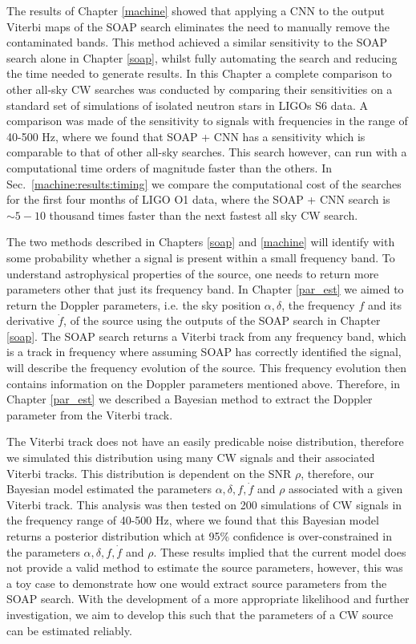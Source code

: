 The results of Chapter \ref{machine} showed that applying a \gls{CNN} to the output
Viterbi maps of the SOAP search eliminates the need to manually remove the
contaminated bands.  This method achieved a similar sensitivity to the SOAP
search alone in Chapter \ref{soap}, whilst fully automating the search and
reducing the time needed to generate results.  In this Chapter a complete
comparison to other all-sky \gls{CW}
searches was conducted by comparing their sensitivities on a standard set of
simulations of isolated neutron stars in \glspl{LIGO} S6 data.  A comparison
was made of the sensitivity to signals with frequencies in the range of 40-500
Hz, where we found that SOAP + \gls{CNN} has a sensitivity which is comparable to that of other all-sky searches.
This search however, can run with a computational time orders of magnitude
faster than the others. In Sec.~\ref{machine:results:timing} we
compare the computational cost of the searches for the first four months of
\gls{LIGO} O1 data, where the SOAP + \gls{CNN} search is $\sim 5 - 10$ thousand
times faster than the next fastest all sky \gls{CW} search.

\bigskip

The two methods described in Chapters \ref{soap} and \ref{machine} will
identify with some probability whether a signal is present within a small
frequency band.  To understand astrophysical properties of the source, one
needs to return more parameters other that just its frequency band.  In Chapter
\ref{par_est} we aimed to return the Doppler parameters, i.e. the sky position
$\alpha, \delta$, the frequency $f$ and its derivative $\dot{f}$, of the source
using the outputs of the SOAP search in Chapter \ref{soap}.  The SOAP search
returns a Viterbi track from any frequency band, which is a track in frequency
where assuming SOAP has correctly identified the signal, will describe the
frequency evolution of the source.  This frequency evolution then contains
information on the Doppler parameters mentioned above.  Therefore, in Chapter
\ref{par_est} we described a Bayesian method to extract the Doppler parameter
from the Viterbi track.

The Viterbi track does not have an easily predicable noise distribution,
therefore we simulated this distribution using many \gls{CW} signals and their
associated Viterbi tracks.  This distribution is dependent on the \gls{SNR}
$\rho$, therefore, our Bayesian model estimated the parameters $\alpha, \delta,
f, \dot{f}$ and $\rho$ associated with a given Viterbi track.  This analysis
was then tested on 200 simulations of \gls{CW} signals in the frequency range
of 40-500 Hz, where we found that this Bayesian model returns a posterior
distribution which at 95\% confidence is over-constrained in the parameters
$\alpha,\delta,f,\dot{f}$ and $\rho$.  These results implied that the current
model does not provide a valid method to estimate the source parameters,
however, this was a toy case to demonstrate how one would extract source
parameters from the SOAP search.  With the development of a more appropriate
likelihood and further investigation, we aim to develop this such that the
parameters of a \gls{CW} source can be estimated reliably.~

